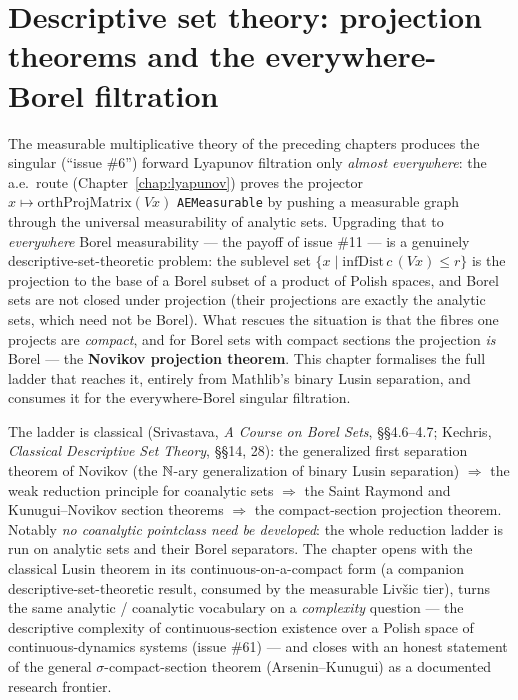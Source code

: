 \chapter{Descriptive set theory: projection theorems and the everywhere-Borel filtration}
\label{ch:dst}

The measurable multiplicative theory of the preceding chapters produces the singular
(``issue \#6'') forward Lyapunov filtration only \emph{almost everywhere}: the a.e.\ route
(Chapter~\ref{chap:lyapunov}) proves the projector \(x\mapsto\mathrm{orthProjMatrix}(V x)\)
\texttt{AEMeasurable} by pushing a measurable graph through the universal measurability of analytic
sets. Upgrading that to \emph{everywhere} Borel measurability --- the payoff of issue \#11 --- is a
genuinely descriptive-set-theoretic problem: the sublevel set \(\{x\mid \mathrm{infDist}\,c\,(V
x)\le r\}\) is the projection to the base of a Borel subset of a product of Polish spaces, and
Borel sets are not closed under projection (their projections are exactly the analytic sets, which
need not be Borel). What rescues the situation is that the fibres one projects are \emph{compact},
and for Borel sets with compact sections the projection \emph{is} Borel --- the \textbf{Novikov
projection theorem}. This chapter formalises the full ladder that reaches it, entirely from
Mathlib's binary Lusin separation, and consumes it for the everywhere-Borel singular filtration.

The ladder is classical (Srivastava, \emph{A Course on Borel Sets}, \S\S4.6--4.7; Kechris,
\emph{Classical Descriptive Set Theory}, \S\S14, 28): the generalized first separation theorem of
Novikov (the \(\mathbb{N}\)-ary generalization of binary Lusin separation) \(\Rightarrow\) the weak
reduction principle for coanalytic sets \(\Rightarrow\) the Saint Raymond and Kunugui--Novikov
section theorems \(\Rightarrow\) the compact-section projection theorem. Notably \emph{no coanalytic
pointclass need be developed}: the whole reduction ladder is run on analytic sets and their Borel
separators. The chapter opens with the classical Lusin theorem in its continuous-on-a-compact form
(a companion descriptive-set-theoretic result, consumed by the measurable Livšic tier), turns the
same analytic / coanalytic vocabulary on a \emph{complexity} question --- the descriptive complexity
of continuous-section existence over a Polish space of continuous-dynamics systems (issue \#61) ---
and closes with an honest statement of the general \(\sigma\)-compact-section theorem
(Arsenin--Kunugui) as a documented research frontier.

